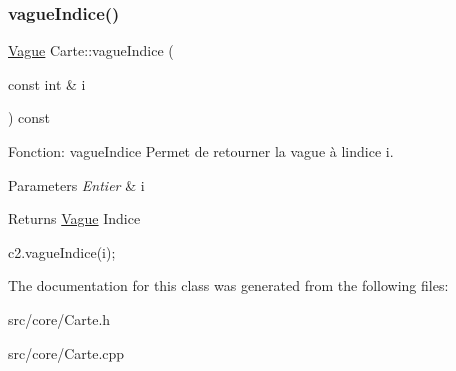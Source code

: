 \subsubsection{\texorpdfstring{vague\+Indice()}{vagueIndice()}}
{\footnotesize\ttfamily \hyperlink{classVague}{Vague} Carte\+::vague\+Indice (\begin{DoxyParamCaption}\item[{const int \&}]{i }\end{DoxyParamCaption}) const}



Fonction\+: vague\+Indice Permet de retourner la vague à l\textquotesingle{}indice i. 


\begin{DoxyParams}{Parameters}
{\em Entier} & i \\
\hline
\end{DoxyParams}
\begin{DoxyReturn}{Returns}
\hyperlink{classVague}{Vague} Indice 
\begin{DoxyCode}
c2.vagueIndice(i);
\end{DoxyCode}
 
\end{DoxyReturn}


The documentation for this class was generated from the following files\+:\begin{DoxyCompactItemize}
\item 
src/core/Carte.\+h\item 
src/core/Carte.\+cpp\end{DoxyCompactItemize}
